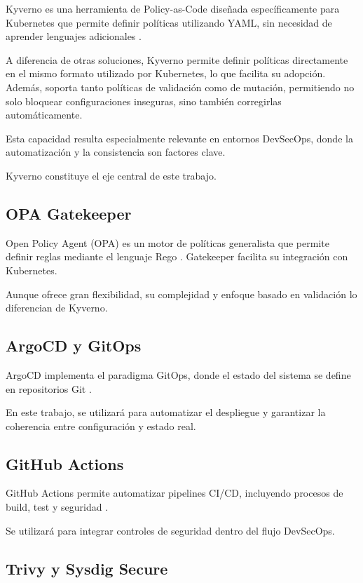 Kyverno es una herramienta de Policy-as-Code diseñada específicamente para Kubernetes que permite definir políticas utilizando YAML, sin necesidad de aprender lenguajes adicionales \cite{kyverno_docs}.

A diferencia de otras soluciones, Kyverno permite definir políticas directamente en el mismo formato utilizado por Kubernetes, lo que facilita su adopción. Además, soporta tanto políticas de validación como de mutación, permitiendo no solo bloquear configuraciones inseguras, sino también corregirlas automáticamente.

Esta capacidad resulta especialmente relevante en entornos DevSecOps, donde la automatización y la consistencia son factores clave.

Kyverno constituye el eje central de este trabajo.

\subsection{OPA Gatekeeper}

Open Policy Agent (OPA) es un motor de políticas generalista que permite definir reglas mediante el lenguaje Rego \cite{opa_docs}. Gatekeeper facilita su integración con Kubernetes.

Aunque ofrece gran flexibilidad, su complejidad y enfoque basado en validación lo diferencian de Kyverno.

\subsection{ArgoCD y GitOps}

ArgoCD implementa el paradigma GitOps, donde el estado del sistema se define en repositorios Git \cite{weaveworks_gitops}.

En este trabajo, se utilizará para automatizar el despliegue y garantizar la coherencia entre configuración y estado real.

\subsection{GitHub Actions}

GitHub Actions permite automatizar pipelines CI/CD, incluyendo procesos de build, test y seguridad \cite{github_actions_docs}.

Se utilizará para integrar controles de seguridad dentro del flujo DevSecOps.

\subsection{Trivy y Sysdig Secure}

